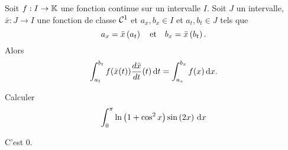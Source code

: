 \documentclass{magnolia}
\begin{document}
\begin{proposition}[utile=3, nom=Changement de variables]
  Soit $f:I\to\mathbb{K}$ une fonction continue sur un intervalle $I$. Soit $J$ un intervalle,
  $\bar{x}:J\to I$ une fonction de classe $\mathcal{C}^{1}$ et
  $a_x,b_x \in I$ et $a_t,b_t \in J$ tels que
  $$a_x=\bar{x}\left(a_t\right) \quad \text{et} \quad b_x=\bar{x}\left(b_t\right).$$
  Alors
  \[\int_{a_t}^{b_t} f(\bar{x}(t))\frac{d\bar{x}}{dt}(t)\,\text{d}t=\int_{a_x}^{b_x} f(x)\,\text{d}x.\]
\end{proposition}

\begin{exoUnique}
\exemple Calculer
  \[\int_{0}^{\pi} \ln\left(1+\cos^2 x\right)\sin\left(2x\right)\,\text{d}x\]
  \begin{sol}
  C'est 0.
  \end{sol}
\end{exoUnique}



\end{document}
